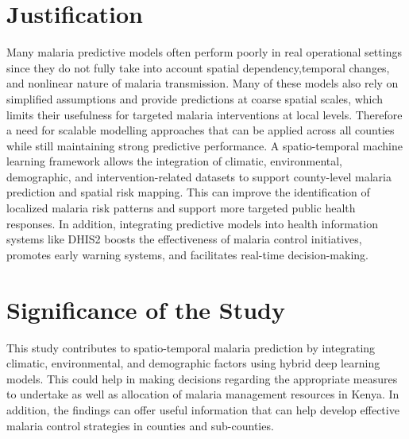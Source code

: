 \section{Justification }
Many malaria predictive models  often perform poorly in real operational settings since they do not fully take into account spatial dependency,temporal changes, and nonlinear nature of malaria transmission. Many of these models also rely on simplified assumptions and provide predictions at coarse spatial scales, which limits their usefulness for targeted malaria interventions at local levels. Therefore a need for scalable modelling approaches that can be applied across all counties while still maintaining strong predictive performance. A spatio-temporal machine learning framework allows the integration of climatic, environmental, demographic, and intervention-related datasets to support county-level malaria prediction and spatial risk mapping. This can improve the identification of localized malaria risk patterns and support more targeted public health responses. In addition, integrating predictive models into health information systems like DHIS2 boosts the effectiveness of malaria control initiatives, promotes early warning systems, and facilitates real-time decision-making.

\section{Significance of the Study}
This study contributes to spatio-temporal malaria prediction by integrating climatic, environmental, and demographic factors using hybrid deep learning models. This could help in making decisions regarding the appropriate measures to undertake as well as allocation of malaria management resources in Kenya. In addition, the findings can offer useful information that can help develop effective malaria control strategies in counties and sub-counties.







